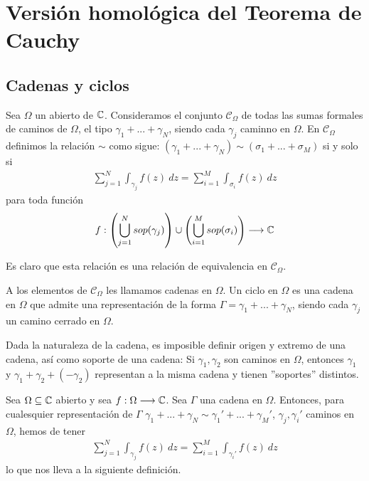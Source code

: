 \chapter{Versión homológica del Teorema de Cauchy}

\section{Cadenas y ciclos}

\begin{defi}
    Sea $\Omega$ un abierto de $\mathbb{C}$. Consideramos el conjunto $\mathcal{C}_{\Omega}$ de todas las sumas formales de caminos de $\Omega$, el tipo $\gamma_1 + ... + \gamma_N$, siendo cada $\gamma_j$ caminno en $\Omega$. En $\mathcal{C}_{\Omega}$ definimos la relación $\sim$ como sigue: $(\gamma_1 + ... + \gamma_N) \sim (\sigma_1 + ... + \sigma_M)$ si y solo si
    \begin{align*}
        \sum_{j=1}^{N} \int_{\gamma_j} f(z) \ dz = \sum_{i=1}^{M} \int_{\sigma_i} f(z) \ dz
    \end{align*}
    para toda función
    \begin{align*}
        f : \left(\bigcup_{j=1}^{N} sop(\gamma_j)\right) \cup \left(\bigcup_{i=1}^{M} sop(\sigma_i)\right) \longrightarrow \mathbb{C}
    \end{align*}
\end{defi}

\begin{obs}
    Es claro que esta relación es una relación de equivalencia en $\mathcal{C}_{\Omega}$.
\end{obs}

\begin{defi}
    A los elementos de $\mathcal{C}_{\Omega}$ les llamamos cadenas en $\Omega$. Un ciclo en $\Omega$ es una cadena en $\Omega$ que admite una representación de la forma $\Gamma = \gamma_1 + ... + \gamma_N$, siendo cada $\gamma_j$ un camino cerrado en $\Omega$.
\end{defi}

\begin{obs}
    Dada la naturaleza de la cadena, es imposible definir origen y extremo de una cadena, así como soporte de una cadena: Si $\gamma_1,\gamma_2$ son caminos en $\Omega$, entonces $\gamma_1$ y $\gamma_1 + \gamma_2 + (-\gamma_2)$ representan a la misma cadena y tienen ''soportes'' distintos.
\end{obs}

\begin{obs}
    Sea $\Omega \subseteq \mathbb{C}$ abierto y sea $f: \Omega \longrightarrow \mathbb{C}$. Sea $\Gamma$ una cadena en $\Omega$. Entonces, para cualesquier representación de $\Gamma$ $\gamma_1 + ... + \gamma_N \sim \gamma_1' + ... + \gamma_M'$, $\gamma_j,\gamma_i'$ caminos en $\Omega$, hemos de tener
    \begin{align*}
        \sum_{j=1}^{N} \int_{\gamma_j} f(z) \ dz = \sum_{i=1}^{M} \int_{\gamma_i'} f(z) \ dz
    \end{align*}
    lo que nos lleva a la siguiente definición.
\end{obs}

